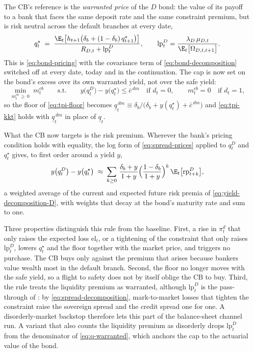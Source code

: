\begin{yaddblock}
The CB's reference is the \emph{warranted price} of the $D$ bond: the value of its
payoff to a bank that faces the same deposit rate and the same constraint premium,
but is risk neutral across the default branches at every date,
\begin{equation}
q^{\star}_t\;=\;\frac{\E_t\bigl[h_{t+1}\bigl(\delta_b+(1-\delta_b)\,q^{\star}_{t+1}\bigr)\bigr]}
                   {R_{D,t}+\mathrm{lp}^{D}_t},
\qquad
\mathrm{lp}^{D}_t=\frac{\lambda_D\,\mu_{D,t}}{\E_t\bigl[\Omega_{D,t,t+1}\bigr]}.
\label{eq:q-warranted}
\end{equation}
This is \eqref{eq:bond-pricing} with the covariance term of
\eqref{eq:bond-decomposition} switched off at every date, today and in the
continuation. The cap is now set on the bond's excess over its own warranted yield,
not over the safe yield:
\begin{equation}
\min_{m^{cb}_t\,\ge\,0}\;m^{cb}_t
\qquad\text{s.t.}\qquad
y\bigl(q^{D}_t\bigr)-y\bigl(q^{\star}_t\bigr)\le\bar c^{\,dm}
\quad\text{if } d_t=0,
\qquad
m^{cb}_t=0\quad\text{if } d_t=1,
\label{eq:cb-objective-dm}
\end{equation}
so the floor of \eqref{eq:tpi-floor} becomes
$\underline q^{\,dm}_t\equiv\delta_b/\bigl(\delta_b+y(q^{\star}_t)+\bar c^{\,dm}\bigr)$
and \eqref{eq:tpi-kkt} holds with $\underline q^{\,dm}_t$ in place of $\underline q_t$.

What the CB now targets is the risk premium. Wherever the bank's pricing condition
holds with equality, the log form of \eqref{eq:spread-prices} applied to $q^{D}_t$
and $q^{\star}_t$ gives, to first order around a yield $y$,
\begin{equation}
y\bigl(q^{D}_t\bigr)-y\bigl(q^{\star}_t\bigr)
\;\approx\;\sum_{k\ge0}\,\frac{\delta_b+y}{1+y}\Bigl(\frac{1-\delta_b}{1+y}\Bigr)^{k}
\,\E_t\bigl[\mathrm{rp}^{D}_{t+k}\bigr],
\label{eq:dm-gap}
\end{equation}
a weighted average of the current and expected future risk premia of
\eqref{eq:yield-decomposition-D}, with weights that decay at the bond's maturity
rate and sum to one.

Three properties distinguish this rule from the baseline. First, a rise in
$\pi^{d}_t$ that only raises the expected loss $\mathrm{el}_t$, or a tightening of
the constraint that only raises $\mathrm{lp}^{D}_t$, lowers $q^{\star}_t$ and the
floor together with the market price, and triggers no purchase. The CB buys only
against the premium that arises because bankers value wealth most in the default
branch. Second, the floor no longer moves with the safe yield, so a flight to
safety does not by itself oblige the CB to buy. Third, the rule treats the
liquidity premium as warranted, although $\mathrm{lp}^{D}_t$ is the pass-through of
\cite{bocola2016pass}: by \eqref{eq:spread-decomposition}, mark-to-market losses
that tighten the constraint raise the sovereign spread and the credit spread one for
one. A disorderly-market backstop therefore lets this part of the balance-sheet
channel run. A variant that also counts the liquidity premium as disorderly drops
$\mathrm{lp}^{D}_t$ from the denominator of \eqref{eq:q-warranted}, which anchors
the cap to the actuarial value of the bond.


\end{yaddblock}
